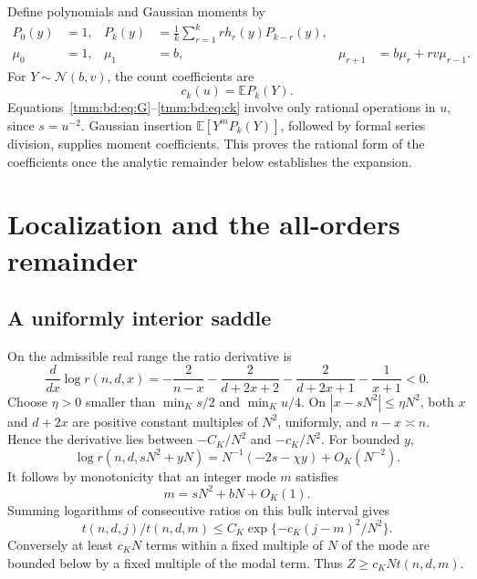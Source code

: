 \documentclass[11pt,letterpaper]{article}
\theoremstyle{remark}\newtheorem{remark}[theorem]{Remark}
\newcommand{\E}{\mathbb E}\newcommand{\Pp}{\mathbb P}
\newcommand{\Normal}{\mathcal N}
\begin{document}
Define polynomials and Gaussian moments by
\begin{align}
 P_0(y)&=1,&
 P_k(y)&=\frac1k\sum_{r=1}^krh_r(y)P_{k-r}(y),\label{tmm:bd:eq:P}\\
 \mu_0&=1,&\mu_1&=b,&
 \mu_{r+1}&=b\mu_r+rv\mu_{r-1}.\label{tmm:bd:eq:mu}
\end{align}
For $Y\sim\Normal(b,v)$, the count coefficients are
\begin{equation}\label{tmm:bd:eq:ck}
 c_k(u)=\E P_k(Y).
\end{equation}
Equations~\eqref{tmm:bd:eq:G}--\eqref{tmm:bd:eq:ck} involve only rational operations in $u$, since $s=u^{-2}$. Gaussian insertion $\E[Y^mP_k(Y)]$, followed by formal series division, supplies moment coefficients. This proves the rational form of the coefficients once the analytic remainder below establishes the expansion.

\section{Localization and the all-orders remainder}\label{tmm:bd:sec:proof}
\subsection{A uniformly interior saddle}
On the admissible real range the ratio derivative is
\begin{equation}\label{tmm:bd:eq:rderivative}
 \frac{d}{dx}\log r(n,d,x)
 =-\frac2{n-x}-\frac2{d+2x+2}-\frac2{d+2x+1}-\frac1{x+1}<0.
\end{equation}
Choose $\eta>0$ smaller than $\min_Ks/2$ and $\min_Ku/4$. On $|x-sN^2|\le\eta N^2$, both $x$ and $d+2x$ are positive constant multiples of $N^2$, uniformly, and $n-x\asymp n$. Hence the derivative lies between $-C_K/N^2$ and $-c_K/N^2$. For bounded $y$,
\[
 \log r(n,d,sN^2+yN)=N^{-1}(-2s-\chi y)+O_K(N^{-2}).
\]
It follows by monotonicity that an integer mode $m$ satisfies
\begin{equation}\label{tmm:bd:eq:mode}
 m=sN^2+bN+O_K(1).
\end{equation}
Summing logarithms of consecutive ratios on this bulk interval gives
\begin{equation}\label{tmm:bd:eq:gausstail}
 t(n,d,j)/t(n,d,m)\le C_K\exp\{-c_K(j-m)^2/N^2\}.
\end{equation}
Conversely at least $c_KN$ terms within a fixed multiple of $N$ of the mode are bounded below by a fixed multiple of the modal term. Thus $Z\ge c_KNt(n,d,m)$.
\end{document}
